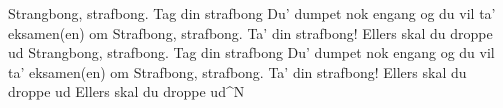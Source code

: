 \documentclass[a4paper,11pt]{article}
\begin{document}
\begin{song}
Strangbong, strafbong. Tag din strafbong
Du’ dumpet nok engang og du vil ta’ eksamen(en) om
Strafbong, strafbong. Ta’ din strafbong!
Ellers skal du droppe ud
Strangbong, strafbong. Tag din strafbong
Du’ dumpet nok engang og du vil ta’ eksamen(en) om
Strafbong, strafbong. Ta’ din strafbong!
Ellers skal du droppe ud
Ellers skal du droppe ud^N





















\end{song}
\end{document}
